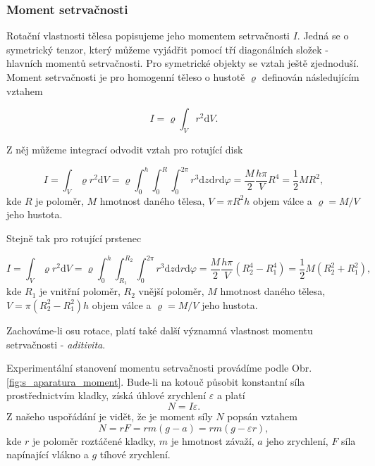 \documentclass[english]{article}
\begin{document}
\subsubsection{Moment setrvačnosti}
Rotační vlastnosti tělesa popisujeme jeho momentem setrvačnosti $I$. Jedná se o symetrický tenzor, který můžeme vyjádřit pomocí tří diagonálních složek - hlavních momentů setrvačnosti. Pro symetrické objekty se vztah ještě zjednoduší. Moment setrvačnosti je pro homogenní těleso o hustotě $\varrho$ definován následujícím vztahem

\begin{equation}
I = \varrho \int_{V} r^2 \mathrm{d}V. 
\end{equation}

Z něj můžeme integrací odvodit vztah pro rotující disk 

\begin{equation}
I = \int_{V} \varrho r^2 \mathrm{d}V = 
\varrho \int_{0}^{h}\int_{0}^{R}\int_{0}^{2 \pi} r^3 \mathrm{d}z \mathrm{d}r \mathrm{d}\varphi = 
\frac{M}{2}\frac{h \pi}{V} R^4 = \frac{1}{2} M R^2,
\label{eq:disk_teo}
\end{equation}
kde $R$ je poloměr, $M$ hmotnost daného tělesa, $V = \pi R^2 h$ objem válce a $\varrho = M/V$ jeho hustota.

Stejně tak pro rotující prstenec

\begin{equation}
I = \int_{V} \varrho r^2 \mathrm{d}V = 
\varrho \int_{0}^{h}\int_{R_1}^{R_2}\int_{0}^{2 \pi} r^3 \mathrm{d}z \mathrm{d}r \mathrm{d}\varphi = 
\frac{M}{2} \frac{h \pi}{V} (R_2^4 - R_1^4)  = \frac{1}{2} M (R_2^2 + R_1^2),
\label{eq:prsten_teo}
\end{equation}
kde $R_1$ je vnitřní poloměr, $R_2$ vnější poloměr, $M$ hmotnost daného tělesa, $V = \pi (R_2^2-R_1^2) h$ objem válce a $\varrho = M/V$ jeho hustota.

Zachováme-li osu rotace, platí také další významná vlastnost momentu setrvačnosti - \emph{aditivita}.

Experimentální stanovení momentu setrvačnosti provádíme podle Obr. \ref{fig:s_aparatura_moment}. Bude-li na kotouč působit konstantní síla prostřednictvím kladky, získá úhlové zrychlení $\varepsilon$ a platí
\begin{equation}
N = I \varepsilon.
\end{equation}
Z našeho uspořádání je vidět, že je moment síly $N$ popsán vztahem
\begin{equation}
N = r F = r m ( g - a ) = r m ( g - \varepsilon r ),
\end{equation}
kde $r$ je poloměr roztáčené kladky, $m$ je hmotnost závaží, $a$ jeho zrychlení, $F$ síla napínající vlákno a $g$ tíhové zrychlení.
\end{document}
